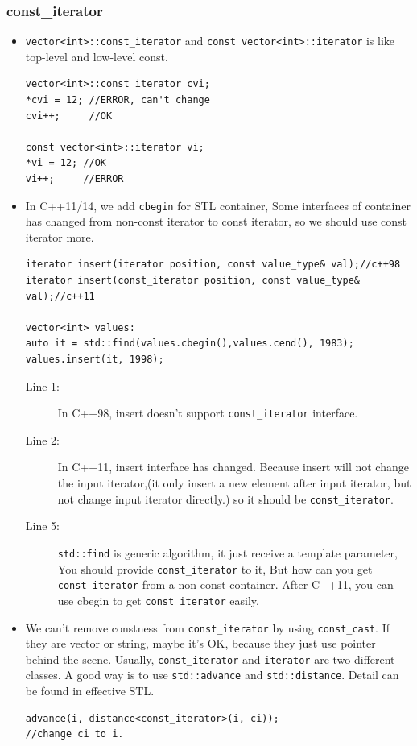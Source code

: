 \documentclass[a4paper,11pt,twoside]{book}
\begin{document}
\subsubsection{const\_iterator}
\begin{itemize}
	\item \texttt{vector<int>::const\_iterator} and \texttt{const vector<int>::iterator} is like top-level and low-level const. 
\begin{lstlisting}[numbers=none]
vector<int>::const_iterator cvi;
*cvi = 12; //ERROR, can't change
cvi++;     //OK

const vector<int>::iterator vi;
*vi = 12; //OK
vi++;     //ERROR
\end{lstlisting}
	
	\item In C++11/14, we add \texttt{cbegin} for STL container, Some interfaces of container has changed from non-const iterator to const iterator, so we should use const iterator more. 
\begin{lstlisting}
iterator insert(iterator position, const value_type& val);//c++98
iterator insert(const_iterator position, const value_type& val);//c++11

vector<int> values:
auto it = std::find(values.cbegin(),values.cend(), 1983);
values.insert(it, 1998);
\end{lstlisting}
	\begin{description}
		\item[Line 1:] In C++98, insert doesn't support \texttt{const\_iterator} interface.
		
		\item[Line 2:] In C++11, insert interface has changed. Because insert will not change the input iterator,(it only insert a new element after input iterator, but not change input iterator directly.) so it should be \texttt{const\_iterator}.
		
		\item[Line 5:] \texttt{std::find} is generic algorithm, it just receive a template parameter,  You should provide \texttt{const\_iterator} to it, But how can you get \texttt{const\_iterator} from a non const container. After C++11, you can use cbegin to get \texttt{const\_iterator} easily.
	\end{description}
	
	\item We can't remove constness from \texttt{const\_iterator} by using \texttt{const\_cast}. If they are vector or string, maybe it's OK, because they just use pointer behind the scene. Usually, \texttt{const\_iterator} and \texttt{iterator} are two different classes. A good way is to use \texttt{std::advance} and \texttt{std::distance}. Detail can be found in effective STL. 
\begin{lstlisting}[]
advance(i, distance<const_iterator>(i, ci));
//change ci to i. 
\end{lstlisting}


\end{itemize}
\end{document}
